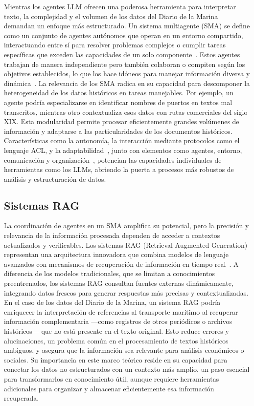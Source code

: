 Mientras los agentes LLM ofrecen una poderosa herramienta para interpretar texto, la complejidad y el volumen de los datos del Diario de la Marina demandan un enfoque más estructurado. Un sistema multiagente (SMA) se define como un conjunto de agentes autónomos que operan en un entorno compartido, interactuando entre sí para resolver problemas complejos o cumplir tareas específicas que exceden las capacidades de un solo componente~\cite{zambrano2020multiagent}. Estos agentes trabajan de manera independiente pero también colaboran o compiten según los objetivos establecidos, lo que los hace idóneos para manejar información diversa y dinámica~\cite{perezpons2021brief}.
La relevancia de los SMA radica en su capacidad para descomponer la heterogeneidad de los datos históricos en tareas manejables. Por ejemplo, un agente podría especializarse en identificar nombres de puertos en textos mal transcritos, mientras otro contextualiza esos datos con rutas comerciales del siglo XIX. Esta modularidad permite procesar eficientemente grandes volúmenes de información y adaptarse a las particularidades de los documentos históricos. Características como la autonomía, la interacción mediante protocolos como el lenguaje ACL, y la adaptabilidad~\cite{perezpons2021brief}, junto con elementos como agentes, entorno, comunicación y organización~\cite{zambrano2020multiagent}, potencian las capacidades individuales de herramientas como los LLMs, abriendo la puerta a procesos más robustos de análisis y estructuración de datos.

\subsection{Sistemas RAG}\label{seq_4}

La coordinación de agentes en un SMA amplifica su potencial, pero la precisión y relevancia de la información procesada dependen de acceder a contextos actualizados y verificables. Los sistemas RAG (Retrieval Augmented Generation) representan una arquitectura innovadora que combina modelos de lenguaje avanzados con mecanismos de recuperación de información en tiempo real~\cite{gao2024retrievalaugmented,lewis2020retrievalaugmented}. A diferencia de los modelos tradicionales, que se limitan a conocimientos preentrenados, los sistemas RAG consultan fuentes externas dinámicamente, integrando datos frescos para generar respuestas más precisas y contextualizadas.
En el caso de los datos del Diario de la Marina, un sistema RAG podría enriquecer la interpretación de referencias al transporte marítimo al recuperar información complementaria —como registros de otros periódicos o archivos históricos— que no está presente en el texto original. Esto reduce errores y alucinaciones, un problema común en el procesamiento de textos históricos ambiguos, y asegura que la información sea relevante para análisis económicos o sociales. Su importancia en este marco teórico reside en su capacidad para conectar los datos no estructurados con un contexto más amplio, un paso esencial para transformarlos en conocimiento útil, aunque requiere herramientas adicionales para organizar y almacenar eficientemente esa información recuperada.

